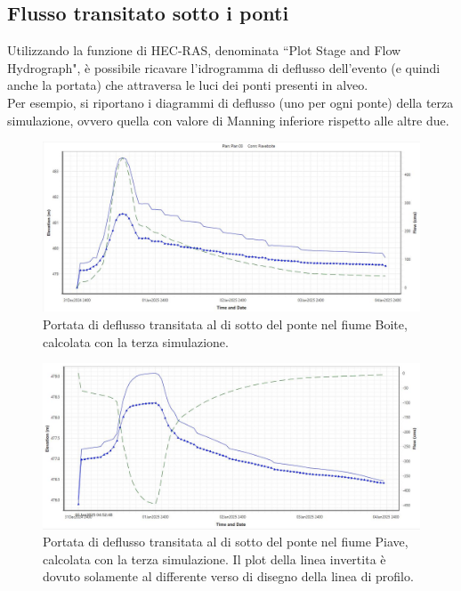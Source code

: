 \subsection{Flusso transitato sotto i ponti}
Utilizzando la funzione di HEC-RAS, denominata ``Plot Stage and Flow Hydrograph", è possibile ricavare l'idrogramma di deflusso dell'evento (e quindi anche la portata) che attraversa le luci dei ponti presenti in alveo.\\
Per esempio, si riportano i diagrammi di deflusso (uno per ogni ponte) della terza simulazione, ovvero quella con valore di Manning inferiore rispetto alle altre due. 
\begin{figure}[H] \centering
    \includegraphics[scale=0.5]{immagini/flow_ponte_boite.JPG}
    \caption{Portata di deflusso transitata al di sotto del ponte nel fiume Boite, calcolata con la terza simulazione.}
    \label{figure:flow_ponte_boite}
\end{figure}

\begin{figure}[H] \centering
    \includegraphics[scale=0.5]{immagini/flow_ponte_piave.JPG}
    \caption{Portata di deflusso transitata al di sotto del ponte nel fiume Piave, calcolata con la terza simulazione. Il plot della linea invertita è dovuto solamente al differente verso di disegno della linea di profilo.}
    \label{figure:flow_ponte_piave}
\end{figure}

